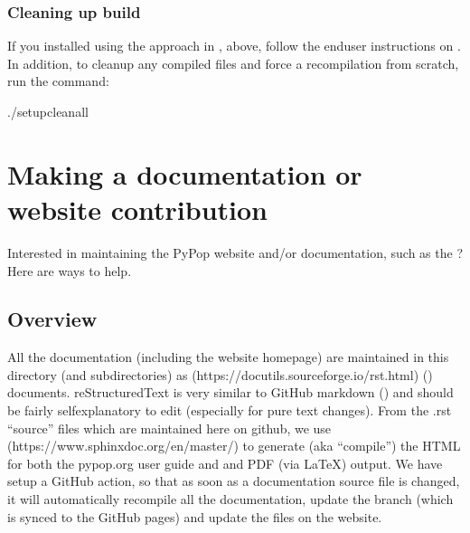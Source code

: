 \documentclass[letterpaper,10pt,english,openany,oneside]{sphinxmanual}
\begin{document}
\subsubsection{Cleaning up build}
\label{\detokenize{docs/guide-chapter-contributing:cleaning-up-build}}
\sphinxAtStartPar
If you installed using the approach in {\hyperref[\detokenize{docs/guide-chapter-contributing:build-and-install-not-recommended-for-developers}]{}}, above, follow the end\sphinxhyphen{}user instructions on
{\hyperref[\detokenize{docs/guide-chapter-install:uninstalling-pypop}]{}}.  In addition, to clean\sphinxhyphen{}up any compiled
files and force a recompilation from scratch, run the 
command:

\begin{sphinxVerbatim}[commandchars=\\\{\}]
./setupclean\PYGZhy{}\PYGZhy{}all
\end{sphinxVerbatim}


\section{Making a documentation or website contribution}
\label{\detokenize{docs/guide-chapter-contributing:making-a-documentation-or-website-contribution}}
\sphinxAtStartPar
Interested in maintaining the PyPop website and/or documentation, such
as the ? Here are ways to help.


\subsection{Overview}
\label{\detokenize{docs/guide-chapter-contributing:overview}}
\sphinxAtStartPar
All the documentation (including the website homepage) are maintained in
this directory (and subdirectories) as
 (https://docutils.sourceforge.io/rst.html)
() documents. reStructuredText is very similar to GitHub
markdown () and should be fairly self\sphinxhyphen{}explanatory to edit
(especially for pure text changes). From the .rst “source” files which
are maintained here on github, we use
 (https://www.sphinx\sphinxhyphen{}doc.org/en/master/) to generate (aka
“compile”) the HTML for both the pypop.org user guide and and PDF (via
LaTeX) output. We have setup a GitHub action, so that as soon as a
documentation source file is changed, it will automatically recompile
all the documentation, update the  branch (which is synced
to the GitHub pages) and update the files on the website.
\end{document}
